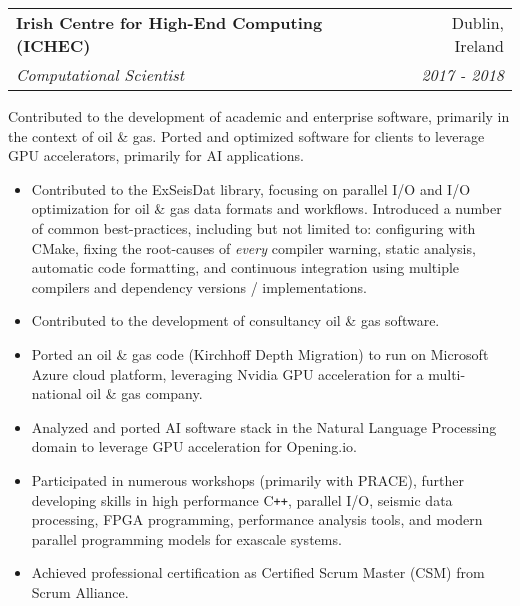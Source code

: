 \documentclass[11pt]{article}
\makeatletter
\newenvironment{resumeSubSectionHeader}{
    \par
    \begin{tabular*}{\textwidth}{l@{\extracolsep{\fill}}r}
    \par
} {
    \end{tabular*}
    \par
}
\newenvironment{resumeSubSectionBody}{
    \par
    \vspace{-0.4\parskip}
    \begin{small}
    \par
} {
    \par
    \end{small}
    \par
}
\newenvironment{resumeItemize}{
    \vspace{-0.5\baselineskip}
    \begin{itemize}
} {
    \end{itemize}
}
\makeatother
\begin{document}
\newpage
\begin{resumeSubSectionHeader}

    \textbf{Irish Centre for High-End Computing (ICHEC)} & Dublin, Ireland \\
    \emph{Computational Scientist}                 & \emph{2017 - 2018}

\end{resumeSubSectionHeader}
\begin{resumeSubSectionBody}

    Contributed to the development of academic and enterprise software,
    primarily in the context of oil \& gas.
    Ported and optimized software for clients to leverage GPU accelerators,
    primarily for AI applications.

    \begin{resumeItemize}
        \item
            Contributed to the ExSeisDat library, focusing on parallel I/O
            and I/O optimization for oil \& gas data formats and workflows.
            Introduced a number of common best-practices, including but not
            limited to: configuring with  CMake, fixing the root-causes of
            {\it every} compiler warning, static analysis, automatic code
            formatting, and continuous integration using multiple compilers and
            dependency versions / implementations.

        \item
            Contributed to the development of consultancy oil \& gas software.

        \item
            Ported an oil \& gas code (Kirchhoff Depth Migration) to run on
            Microsoft Azure cloud platform, leveraging Nvidia GPU acceleration
            for a multi-national oil \& gas company.

        \item
            Analyzed and ported AI software stack in the Natural Language
            Processing domain to leverage GPU acceleration for Opening.io.

        \item
            Participated in numerous workshops (primarily with PRACE), further
            developing skills in high performance C\verb!++!, parallel I/O,
            seismic data processing, FPGA programming, performance analysis
            tools, and modern parallel programming models for exascale systems.

        \item
            Achieved professional certification as Certified Scrum Master (CSM)
            from Scrum Alliance.
    \end{resumeItemize}

\end{resumeSubSectionBody}
\end{document}
